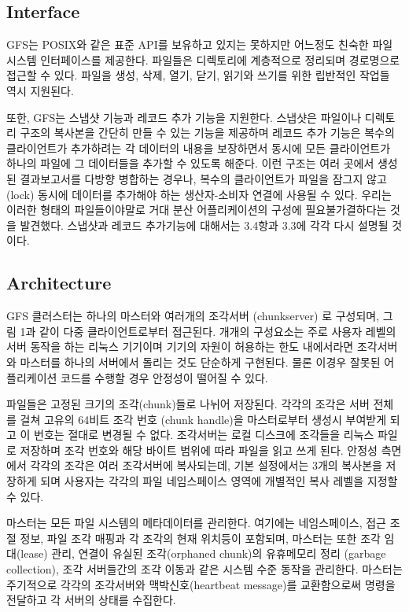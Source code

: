 \documentclass[twocolumn]{article}
\begin{document}
\subsection{Interface}

  GFS는  POSIX와 같은 표준 API를 보유하고 있지는 못하지만 어느정도 친숙한 파일 시스템 인터페이스를 제공한다.  파일들은 디렉토리에 계층적으로 정리되며 경로명으로 접근할 수 있다.  파일을 생성, 삭제, 열기, 닫기, 읽기와 쓰기를 위한 립반적인 작업들 역시 지원된다.

 또한, GFS는 스냅샷 기능과 레코드 추가 기능을 지원한다.  스냅샷은 파일이나 디렉토리 구조의 복사본을 간단히 만들 수 있는 기능을 제공하며 레코드 추가 기능은 복수의 클라이언트가 추가하려는 각 데이터의 내용을 보장하면서 동시에 모든 클라이언트가 하나의 파일에 그 데이터들을 추가할 수 있도록 해준다.  이런 구조는 여러 곳에서 생성된 결과보고서를 다방향 병합하는 경우나, 복수의 클라이언트가 파일을 잠그지 않고 (lock) 동시에 데이터를 추가해야 하는 생산자-소비자 연결에 사용될 수 있다.  우리는 이러한 형태의 파일들이야말로 거대 분산 어플리케이션의 구성에 필요불가결하다는 것을 발견했다.  스냅샷과 레코드 추가기능에 대해서는 3.4항과 3.3에 각각 다시 설명될 것이다.

\subsection{Architecture}

  GFS 클러스터는 하나의 마스터와 여러개의 조각서버 (chunkserver) 로 구성되며, 그림 1과 같이 다중 클라이언트로부터 접근된다.  개개의 구성요소는 주로 사용자 레벨의 서버 동작을 하는 리눅스 기기이며 기기의 자원이 허용하는 한도 내에서라면 조각서버와 마스터를 하나의 서버에서 돌리는 것도 단순하게 구현된다.  물론 이경우 잘못된 어플리케이션 코드를 수행할 경우 안정성이 떨어질 수 있다.

 파일들은 고정된 크기의 조각(chunk)들로 나뉘어 저장된다.  각각의 조각은 서버 전체를 걸쳐 고유의 64비트 조각 번호 (chunk handle)을 마스터로부터 생성시 부여받게 되고 이 번호는 절대로 변경될 수 없다.  조각서버는 로컬 디스크에 조각들을 리눅스 파일로 저장하며 조각 번호와 해당 바이트 범위에 따라 파일을 읽고 쓰게 된다.  안정성 측면에서 각각의 조각은 여러 조각서버에 복사되는데, 기본 설정에서는 3개의 복사본을 저장하게 되며 사용자는 각각의 파일 네임스페이스 영역에 개별적인 복사 레벨을 지정할 수 있다.

 마스터는 모든 파일 시스템의 메타데이터를 관리한다.  여기에는 네임스페이스, 접근 조절 정보, 파일 조각 매핑과 각 조각의 현재 위치등이 포함되며, 마스터는 또한 조각 임대(lease) 관리, 연결이 유실된 조각(orphaned chunk)의 유휴메모리 정리 (garbage collection), 조각 서버들간의 조각 이동과 같은 시스템 수준 동작을 관리한다.  마스터는 주기적으로 각각의 조각서버와 맥박신호(heartbeat message)를 교환함으로써 명령을 전달하고 각 서버의 상태를 수집한다.
\end{document}
